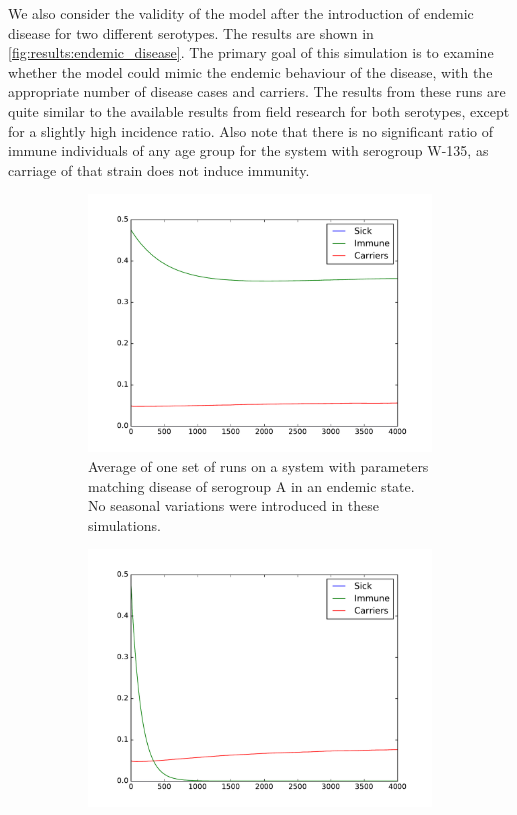\documentclass[10pt,a4paper]{article}
\begin{document}
We also consider the validity of the model after the introduction of endemic disease for two different serotypes. The results are shown in \cref{fig:results:endemic_disease}. The primary goal of this simulation is to examine whether the model could mimic the endemic behaviour of the disease, with the appropriate number of disease cases and carriers. The results from these runs are quite similar to the available results from field research for both serotypes, except for a slightly high incidence ratio. Also note that there is no significant ratio of immune individuals of any age group for the system with serogroup W-135, as carriage of that strain does not induce immunity. 

\begin{figure}[h]
	\centering
	\begin{subfigure}{0.45\textwidth}
		\includegraphics[width=\textwidth]{figures/disease_endemic_1pop_A.pdf}
		\caption{Average of one set of runs on a system with parameters matching disease of serogroup A in an endemic state. No seasonal variations were introduced in these simulations.} \label{fig:results:endemic_disease_A}
	\end{subfigure}
	\begin{subfigure}{0.45\textwidth}
		\includegraphics[width=\textwidth]{figures/disease_endemic_1pop_W135.pdf}

\end{subfigure}
\end{figure}
\end{document}
